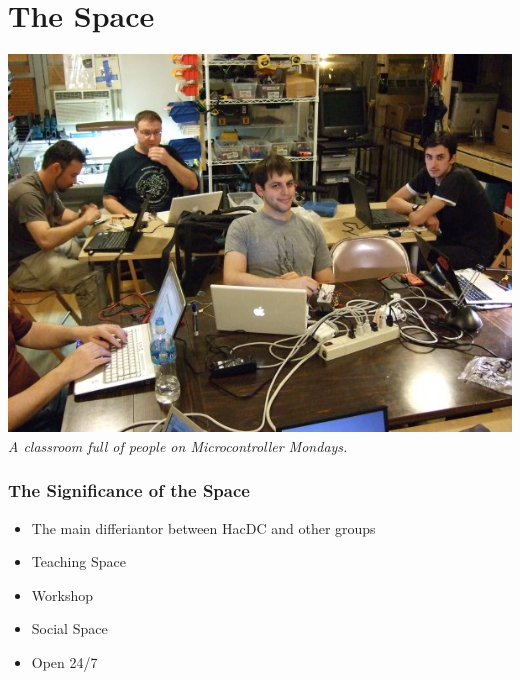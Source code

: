 \documentclass[notes]{beamer}
\begin{document}
\section{The Space}

\begin{frame}[fragile]
  \begin{center}
    \includegraphics[width=.8\textwidth,height=.8\textheight]{dscf2730_small.jpg} \\
    {\small{\em A classroom full of people on Microcontroller Mondays.}}
  \end{center}
\end{frame}

\begin{frame}
  \frametitle{The Significance of the Space}
  \begin{itemize}
  \item The main differiantor between HacDC and other groups
  \item Teaching Space
  \item Workshop
  \item Social Space
  \item Open 24/7
  \end{itemize}
\end{frame}
\end{document}
